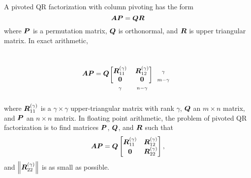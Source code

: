 \documentclass[12pt]{article}
\newcommand{\matrice}[1]{\begin{bmatrix}#1\end{bmatrix}}
\begin{document}
A pivoted QR factorization with column pivoting has the form 
\[
\bm{AP}=\bm{QR}
\]
where $\bm{P}$ is a permutation matrix, $\bm{Q}$ is orthonormal, and $\bm{R}$ is
upper triangular matrix.
In exact arithmetic,
\vspace{-2em}
\begin{eqnarray}
\mtx{AP}=\mtx{Q} %
\begin{blockarray}{ccc}
& & \\
& & \\
\begin{block}{[cc]c}
\mtx{R}_{11}^{(\gamma)} & \mtx{R}_{12}^{(\gamma)} & {\scriptstyle\gamma}\\
\mtx{0} & \mtx{0} & {\scriptstyle m - \gamma} \\
\end{block}
{\scriptstyle\gamma} & {\scriptstyle n - \gamma} & 
\end{blockarray}
\label{eq:pqrf-exact}
\end{eqnarray}
where $\bm{R}_{11}^{(\gamma)}$ is a $\gamma \times \gamma$ upper-triangular matrix with rank $\gamma$, $\bm{Q}$ an $m \times n$ matrix, and $\bm{P}$ an $n \times n$ matrix.
In floating point arithmetic, the problem of pivoted QR factorization is to find matrices $\bm{P}$, $\bm{Q}$, and $\bm{R}$ such that 
\begin{eqnarray}
\mtx{AP}=\mtx{Q}
\matrice{
\mtx{R}_{11}^{(\gamma)} & \mtx{R}_{12}^{(\gamma)}\\
\mtx{0} & \mtx{R}_{22}^{(\gamma)}},
\label{eq:pqrf}
\end{eqnarray}
and $\left\Vert {\bm{R}_{22}^{(\gamma)}} \right\Vert$ is as small as possible.

\end{document}
